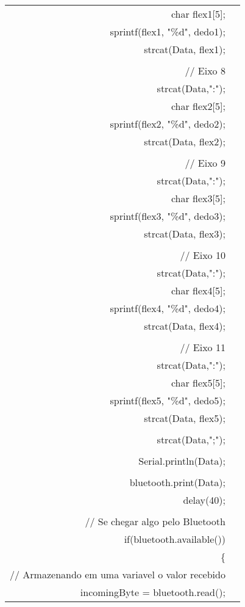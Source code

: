 \begin{longtable}{Rp{15cm}}
\qquad  char flex1[5]; \\
\qquad  sprintf(flex1, "\%d", dedo1);  \\
\qquad  strcat(Data, flex1); \\
\\
\qquad  // Eixo 8 \\
\qquad  strcat(Data,":"); \\
\qquad  char flex2[5];  \\
\qquad  sprintf(flex2, "\%d", dedo2);   \\
\qquad  strcat(Data, flex2); \\
\\
\qquad  // Eixo 9 \\
\qquad  strcat(Data,":"); \\
\qquad  char flex3[5]; \\
\qquad  sprintf(flex3, "\%d", dedo3);  \\
\qquad  strcat(Data, flex3); \\   
\\
\qquad  // Eixo 10 \\
\qquad  strcat(Data,":"); \\
\qquad  char flex4[5];  \\
\qquad  sprintf(flex4, "\%d", dedo4); \\  
\qquad  strcat(Data, flex4); \\    
\\
\qquad  // Eixo 11 \\
\qquad  strcat(Data,":"); \\
\qquad  char flex5[5]; \\
\qquad  sprintf(flex5, "\%d", dedo5); \\  
\qquad  strcat(Data, flex5); \\    
\\  
\qquad  strcat(Data,";"); \\
\\
\qquad Serial.println(Data); \\
\\ 
\qquad  bluetooth.print(Data); \\
\qquad  delay(40); \\
\\
\qquad  // Se chegar algo pelo Bluetooth \\
\qquad  if(bluetooth.available())  \\
\qquad  \{ \\
\qquad \qquad    // Armazenando em uma variavel o valor recebido \\
\qquad \qquad    incomingByte = bluetooth.read(); \\

\end{longtable}
